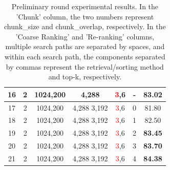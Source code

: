 \documentclass[11pt]{article}
\def\retrievaltextcircled#1{\large{\textcircled{\small{\color{blue}#1}}}\normalsize}
\def\reranktextcircled#1{\large{\textcircled{\small{\textcolor{red}{#1}}}}\normalsize}
\def\datatextcircled#1{\large{\textcircled{\small{#1}}}\normalsize}
\def\fusiontextcircled#1{\large{\textcircled{\small{\color{green}#1}}}\normalsize}
\begin{document}
\begin{table}[ht!]
\begin{tabular}{ccccccc}
16 & \datatextcircled{2} & 1024,200 & \retrievaltextcircled{4},288 &\reranktextcircled{3},6 & - & \textbf{83.02} \\
\midrule
17 & \datatextcircled{2} & 1024,200 & \retrievaltextcircled{4},288 \retrievaltextcircled{3},192 &\reranktextcircled{3},6 & \fusiontextcircled{0} & 81.80 \\
18 & \datatextcircled{2} & 1024,200 & \retrievaltextcircled{4},288 \retrievaltextcircled{3},192 &\reranktextcircled{3},6 & \fusiontextcircled{1} & 82.50 \\
19 & \datatextcircled{2} & 1024,200 & \retrievaltextcircled{4},288 \retrievaltextcircled{3},192 &\reranktextcircled{3},6 & \fusiontextcircled{2} & \textbf{83.45} \\
20 & \datatextcircled{2} & 1024,200 & \retrievaltextcircled{4},288 \retrievaltextcircled{3},192 &\reranktextcircled{3},6 & \fusiontextcircled{3} & \textbf{83.70} \\
21 & \datatextcircled{2} & 1024,200 & \retrievaltextcircled{4},288 \retrievaltextcircled{3},192 &\reranktextcircled{3},6 & \fusiontextcircled{4} & \textbf{84.38} \\
\bottomrule
\end{tabular}
\caption{Preliminary round experimental results. In the 'Chunk' column, the two numbers represent chunk\_size and chunk\_overlap, respectively. In the 'Coarse Ranking' and 'Re-ranking' columns, multiple search paths are separated by spaces, and within each search path, the components separated by commas represent the retrieval/sorting method and top-k, respectively.}
\label{tab:main_res1}
\end{table}
\end{document}
